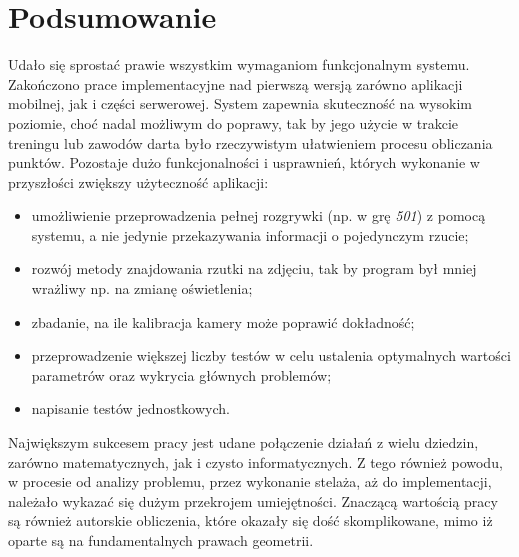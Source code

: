 \chapter{Podsumowanie}
\thispagestyle{chapterBeginStyle}

Udało się sprostać prawie wszystkim wymaganiom funkcjonalnym systemu. Zakończono prace implementacyjne nad pierwszą wersją zarówno aplikacji mobilnej, jak i części serwerowej. System zapewnia skuteczność na wysokim poziomie, choć nadal możliwym do poprawy, tak by jego użycie w trakcie treningu lub zawodów darta było rzeczywistym ułatwieniem procesu obliczania punktów. Pozostaje dużo funkcjonalności i usprawnień, których wykonanie w przyszłości zwiększy użyteczność aplikacji:
\begin{itemize}
  \item umożliwienie przeprowadzenia pełnej rozgrywki (np. w grę \textit{501}) z pomocą systemu, a nie jedynie przekazywania informacji o pojedynczym rzucie;
  \item rozwój metody znajdowania rzutki na zdjęciu, tak by program był mniej wrażliwy np. na zmianę oświetlenia;
  \item zbadanie, na ile kalibracja kamery może poprawić dokładność;
  \item przeprowadzenie większej liczby testów w celu ustalenia optymalnych wartości parametrów oraz wykrycia głównych problemów;
  \item napisanie testów jednostkowych.
  
\end{itemize}

Największym sukcesem pracy jest udane połączenie działań z wielu dziedzin, zarówno matematycznych, jak i czysto informatycznych. Z tego również powodu, w procesie od analizy problemu, przez wykonanie stelaża, aż do implementacji, należało wykazać się dużym przekrojem umiejętności. Znaczącą wartością pracy są również autorskie obliczenia, które okazały się dość skomplikowane, mimo iż oparte są na fundamentalnych prawach geometrii. 